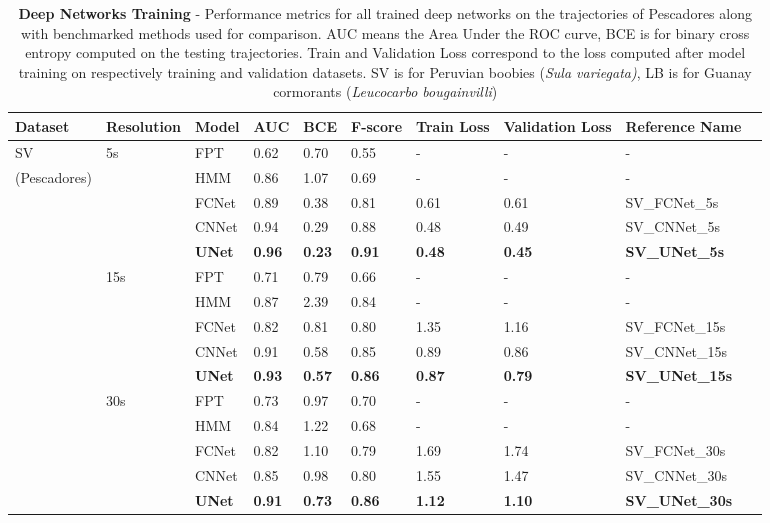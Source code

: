 \documentclass{article}
\begin{document}
\begin{table}[h]
 \caption{\textbf{Deep Networks Training} - Performance metrics for all trained deep networks on the trajectories of Pescadores along with benchmarked methods used for comparison. AUC means the Area Under the ROC curve, BCE is for binary cross entropy computed on the testing trajectories. Train and Validation Loss correspond to the loss computed after model training on respectively training and validation datasets. SV is for Peruvian boobies (\textit{Sula variegata)}, LB is for Guanay cormorants (\textit{Leucocarbo bougainvilli})}
  \centering
  \begin{tabular}{llllllllll}
    \toprule
    Dataset  &  Resolution &  Model &  AUC & BCE & F-score & Train Loss & Validation Loss & Reference Name\\
    \midrule
    SV       & 5s  & FPT    & 0.62 & 0.70 & 0.55 & - & -  & -\\
(Pescadores) &     & HMM    & 0.86 & 1.07 & 0.69 & - & -  & - \\
             &     & FCNet  & 0.89 & 0.38 & 0.81 & 0.61 & 0.61 & SV\_FCNet\_5s \\
             &     & CNNet  & 0.94 & 0.29 & 0.88 & 0.48 & 0.49 & SV\_CNNet\_5s \\
             &     & {\bf UNet} & {\bf 0.96} & {\bf 0.23} & {\bf 0.91} & {\bf 0.48} & {\bf 0.45} & {\bf SV\_UNet\_5s}\\
             & 15s & FPT    & 0.71 & 0.79 & 0.66 & - & - & - \\
             &     & HMM    & 0.87 & 2.39 & 0.84 & - & - & - \\
             &     & FCNet  & 0.82 & 0.81 & 0.80 & 1.35 & 1.16 & SV\_FCNet\_15s \\
             &     & CNNet  & 0.91 & 0.58 & 0.85 & 0.89 & 0.86 & SV\_CNNet\_15s \\
             &     & {\bf UNet} & {\bf 0.93} & {\bf 0.57} & {\bf 0.86} & {\bf 0.87} & {\bf 0.79} & {\bf SV\_UNet\_15s} \\
             & 30s & FPT    & 0.73 & 0.97 & 0.70 &  - & - & - \\
             &     & HMM    & 0.84 & 1.22 & 0.68 & - & - & - \\
             &     & FCNet  & 0.82 & 1.10 & 0.79 & 1.69 & 1.74 & SV\_FCNet\_30s \\
             &     & CNNet  & 0.85 & 0.98 & 0.80 & 1.55 & 1.47 & SV\_CNNet\_30s \\
             &     & {\bf UNet} & {\bf 0.91} & {\bf 0.73} & {\bf 0.86} & {\bf 1.12} & {\bf 1.10} & {\bf SV\_UNet\_30s} \\

\end{tabular}
\end{table}
\end{document}

